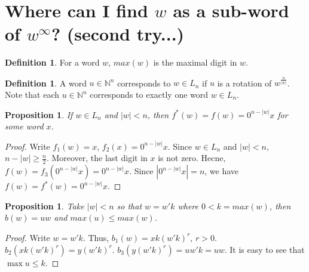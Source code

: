 \documentclass{article}
\newtheorem{proposition}[theorem]{Proposition}
\theoremstyle{definition}
\newtheorem{definition}[theorem]{Definition}
\begin{document}
\section{Where can I find $w$ as a sub-word of $w^\infty$? (second try...)}
		
\begin{definition}
For a word $w$, $max(w)$ is the maximal digit in $w$.
\end{definition}

\begin{definition}
A word $u\in \mathbb{N}^n$ corresponds to $w\in L_n$ if $u$ is a rotation of $w^{\frac{n}{|w|}}$. Note that each $u\in \mathbb{N}^n$ corresponds to exactly one word $w\in L_n$.
\end{definition}

\begin{proposition}
\label{newforward}
If $w\in L_n$ and $|w|<n$, then $f^*(w)=f(w)=0^{n-|w|}x$ for some word $x$.
\end{proposition}
\begin{proof}
Write $f_1(w)=x$, $f_2(x)=0^{n-|w|}x$. Since $w\in L_n$ and $|w|<n$, $n-|w|\geq \frac{n}{2}$. Moreover, the last digit in $x$ is not zero. Hecne, $f(w)=f_3(0^{n-|w|}x)=0^{n-|w|}x$. Since $|0^{n-|w|}x|=n$, we have $f(w)=f^*(w)=0^{n-|w|}x$.
\end{proof}

\begin{proposition}
\label{1-back}
Take $|w|<n$ so that $w=w'k$ where $0<k=max(w)$, then $b(w)=uw$ and $max(u)\leq max(w)$. 
\end{proposition}
\begin{proof}
Write $w=w'k$. Thus, $b_1(w)=xk(w'k)^r$, $r>0$. $b_2(xk(w'k)^r)=y(w'k)^r$. $b_3(y(w'k)^r)=uw'k=uw$. It is easy to see that $\max{u}\leq k$.
\end{proof}


\end{document}
